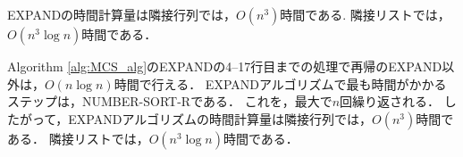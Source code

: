 \begin{lemma}[EXPANDの時間計算量]
    EXPANDの時間計算量は隣接行列では，$O(n^3)$時間である.
    隣接リストでは，$O(n^3 \log n)$時間である．
\end{lemma}

\begin{Proof*}{}
    Algorithm \ref{alg:MCS_alg}のEXPANDの4--17行目までの処理で再帰のEXPAND以外は，$O(n \log n)時間$で行える．
    EXPANDアルゴリズムで最も時間がかかるステップは，NUMBER-SORT-Rである．
    これを，最大で$n$回繰り返される．
    したがって，EXPANDアルゴリズムの時間計算量は隣接行列では，$O(n^3)$時間である．
    隣接リストでは，$O(n^3 \log n )$時間である．
\end{Proof*}


